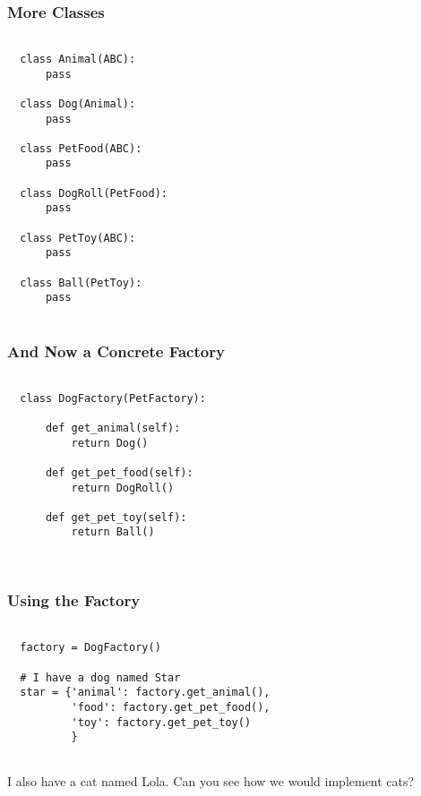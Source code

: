 \documentclass[10pt]{beamer}
\begin{document}
\begin{frame}[fragile]
  \frametitle{More Classes}

  
  \begin{verbatim}
  
  class Animal(ABC):
      pass
      
  class Dog(Animal):
      pass    
      
  class PetFood(ABC):
      pass
      
  class DogRoll(PetFood):
      pass    
      
  class PetToy(ABC):
      pass
      
  class Ball(PetToy):
      pass           
      
  \end{verbatim}
\end{frame}  
  
  
\begin{frame}[fragile]
  \frametitle{And Now a Concrete Factory}

  
  \begin{verbatim}
  
  class DogFactory(PetFactory):
  
      def get_animal(self):
          return Dog()
          
      def get_pet_food(self):
          return DogRoll()
          
      def get_pet_toy(self):
          return Ball()          

  
  \end{verbatim}
\end{frame} 
  
\begin{frame}[fragile]
  \frametitle{Using the Factory}

  
  \begin{verbatim}
  
  factory = DogFactory()
  
  # I have a dog named Star
  star = {'animal': factory.get_animal(),
          'food': factory.get_pet_food(),
          'toy': factory.get_pet_toy()
          } 
  
  \end{verbatim}
  
  I also have a cat named Lola. Can you see how we would implement cats?
\end{frame} 
\end{document}
